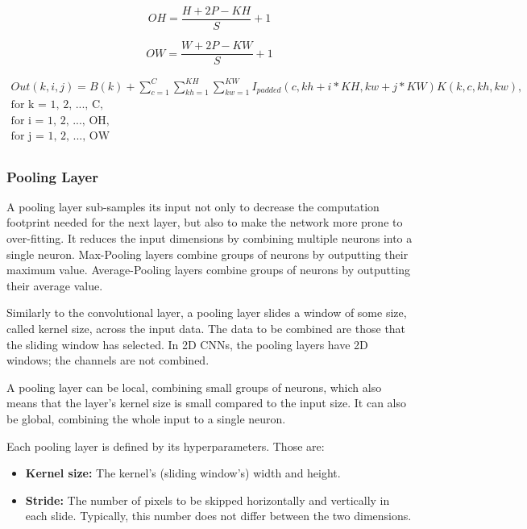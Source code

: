 \begin{equation}
	OH = \frac{H + 2P - KH}{S} + 1
\end{equation}

\begin{equation}
	OW = \frac{W + 2P - KW}{S} + 1
\end{equation}

\begin{equation}
	\label{eqn:convolution}
	\begin{split}
		Out(k, i, j) = B(k) +
		\sum_{c = 1}^{C} \sum_{kh = 1}^{KH} \sum_{kw = 1}^{KW}
		I_{padded}(c, kh + i * KH, kw + j * KW) K(k, c, kh, kw),\\
		\mbox{for k = 1, 2, ..., C},\\
		\mbox{for i = 1, 2, ..., OH},\\
		\mbox{for j = 1, 2, ..., OW}\\
	\end{split}
\end{equation}

\subsubsection{Pooling Layer}
A pooling layer sub-samples its input not only to decrease the computation footprint needed for the next layer, but also to make the network more prone to over-fitting. It reduces the input dimensions by combining multiple neurons into a single neuron. Max-Pooling layers combine groups of neurons by outputting their maximum value. Average-Pooling layers combine groups of neurons by outputting their average value.

Similarly to the convolutional layer, a pooling layer slides a window of some size, called kernel size, across the input data. The data to be combined are those that the sliding window has selected. In 2D CNNs, the pooling layers have 2D windows; the channels are not combined.

A pooling layer can be local, combining small groups of neurons, which also means that the layer's kernel size is small compared to the input size. It can also be global, combining the whole input to a single neuron.

Each pooling layer is defined by its hyperparameters. Those are:
\begin{itemize}
	\item \textbf{Kernel size:} The kernel's (sliding window's) width and height.
	\item \textbf{Stride:} The number of pixels to be skipped horizontally and vertically in each slide. Typically, this number does not differ between the two dimensions.
\end{itemize}

